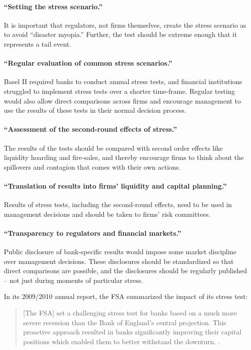 \documentclass[12pt]{article}
\begin{document}
\paragraph{``Setting the stress scenario.''} It is important that regulators, not firms themselves, create the stress scenario as to avoid ``disaster myopia.'' Further, the test should be extreme enough that it represents a tail event.

\paragraph{``Regular evaluation of common stress scenarios.''} Basel II required banks to conduct annual stress tests, and financial institutions struggled to implement stress tests over a shorter time-frame. Regular testing would also allow direct comparisons across firms and encourage management to use the results of these tests in their normal decision process.

\paragraph{``Assessment of the second-round effects of stress.''} The results of the tests should be compared with second order effects like liquidity hoarding and fire-sales, and thereby encourage firms to think about the spillovers and contagion that comes with their own actions.

\paragraph{``Translation of results into firms' liquidity and capital planning.''} Results of stress tests, including the second-round effects, need to be used in management decisions and should be taken to firms' risk committees.

\paragraph{``Transparency to regulators and financial markets.''} Public disclosure of bank-specific results would impose some market discipline over management decisions. These disclosures should be standardized so that direct comparisons are possible, and the disclosures should be regularly published -- not just during moments of particular stress.

In its 2009/2010 annual report, the FSA summarized the impact of its stress test:

\begin{quote}
[The FSA] set a challenging stress test for banks based on a much more severe recession than the Bank of England’s central projection. This proactive approach resulted in banks significantly improving their capital positions which enabled them to better withstand the downturn. \citep{FSAReport}.
\end{quote}
\end{document}
